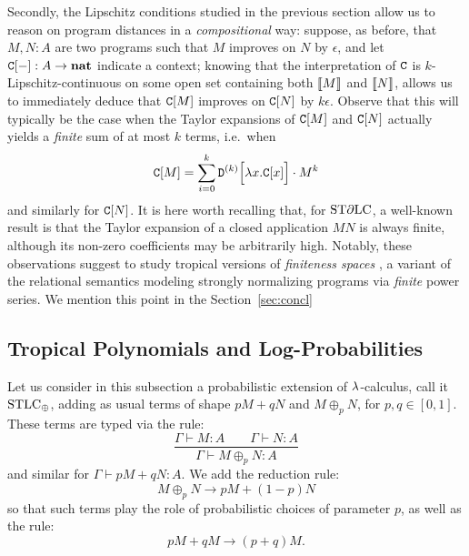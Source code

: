 Secondly, the Lipschitz conditions studied in the previous section allow us to reason on program distances in a \emph{compositional} way: suppose, as before, that $M,N:A$ are two programs such that $M$ improves on $N$ by $\epsilon$, and let $\mathtt{C}[-]:A \to \mathbf{nat}$ indicate a context; knowing that the interpretation of $\mathtt{C}$ is $k$-Lipschitz-continuous on some open set containing both $\llbracket M\rrbracket$ and $\llbracket N\rrbracket$, allows us to immediately deduce that $\mathtt{C}[M]$ improves on $\mathtt{C}[N]$ by $k \epsilon$. 
Observe that this will typically be the case when the Taylor expansions of $\mathtt{C}[M]$ and $\mathtt{C}[N]$ actually yields a \emph{finite} sum of at most $k$ terms, i.e.~when 
\begin{align}
\mathtt{C}[M] = \sum_{i=0}^{k} \mathtt{D}^{(k)}\Big[\lambda x.\mathtt{C}[x]\Big]\cdot M^{k}
\end{align}
and similarly for $\mathtt{C}[N]$. It is here worth recalling that, for $\mathrm{ST}\partial\mathrm{LC}$, a well-known result \cite{difflambda} is that the Taylor expansion of a closed application $MN$ is always finite, although its non-zero coefficients may be arbitrarily high. 
Notably, these observations suggest to study tropical versions of \emph{finiteness spaces} \cite{Ehrhard2005}, 
a variant of the relational semantics modeling strongly normalizing programs via \emph{finite} power series.
We mention this point in the Section~\ref{sec:concl}


\subsection{Tropical Polynomials and Log-Probabilities}

Let us consider in this subsection a probabilistic extension of $\lambda$-calculus, call it $\mathrm{STLC}_\oplus$, adding as usual terms of shape $pM+qN$ and $M\oplus_p N$, for $p,q\in[0,1]$.
These terms are typed via the rule:
\[
 \dfrac{\Gamma\vdash M:A \qquad \Gamma\vdash N:A}{\Gamma\vdash M\oplus_p N:A}
\]
and similar for $\Gamma\vdash pM+qN:A$.
We add the reduction rule:
\[
 M\oplus_p N \to pM+(1-p)N
\]
so that such terms play the role of probabilistic choices of parameter $p$, as well as the rule:
\[
 pM+qM\to (p+q)M.
\]

